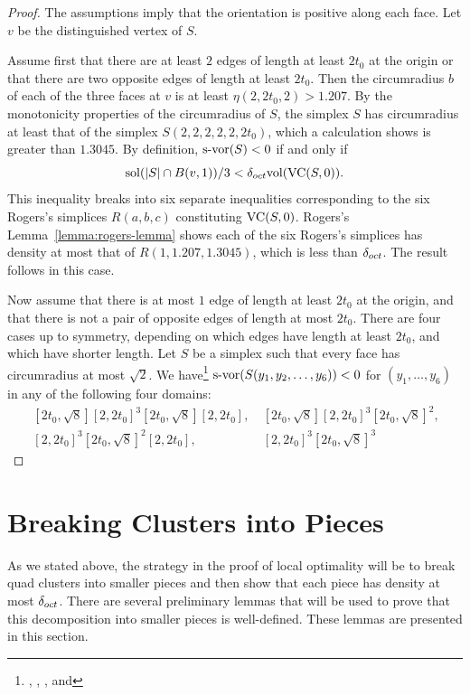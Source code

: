 \begin{proof} The assumptions imply that the orientation is positive
along each face.  Let $v$ be the distinguished vertex of $S$.

Assume first that there are at least $2$ edges of length at least
$2t_0$ at the origin or that there are two opposite edges of length
at least $2t_0$.  Then the circumradius $b$ of each of the three
faces at $v$ is at least $\eta(2,2t_0,2) > 1.207$.  By the
monotonicity properties of the circumradius of $S$, the simplex $S$
has circumradius at least that of the simplex $S(2,2,2,2,2,2t_0)$,
which a calculation shows is greater than $1.3045$.  By definition,
$\operatorname{s-vor}(S)<0$ if and only if
    $$
    \operatorname{sol}(|S|\cap B(v,1))/3 < \delta_{oct} {\operatorname{vol}}({\operatorname{VC}}(S,0)).
    $$
This inequality breaks into six separate inequalities
corresponding to the six Rogers's simplices $R(a,b,c)$
constituting ${\operatorname{VC}}(S,0)$. Rogers's
Lemma~\ref{lemma:rogers-lemma} shows each of the six Rogers's
simplices has density at most that of $R(1,1.207,1.3045)$, which
is less than $\delta_{oct}$.  The result follows in this case.

Now assume that there is at most $1$ edge of length at least
$2t_0$ at the origin, and that there is not a pair of opposite
edges of length at most $2t_0$.  There are four cases up to
symmetry, depending on which edges have length at least $2t_0$,
and which have shorter length.  Let $S$ be a simplex such that
every face has circumradius at most $\sqrt2$.  We
have\footnote{, ,
, and }
$\operatorname{s-vor}(S(y_1,y_2,\ldots,y_6))<0$ for $(y_1,\ldots,y_6)$ in any of
the following four domains:
    $$
    \begin{array}{lll}
        \ [2t_0,\sqrt8][2,2t_0]^3[2t_0,\sqrt8][2,2t_0], &
        \ [2t_0,\sqrt8][2,2t_0]^3[2t_0,\sqrt8]^2,\\
        \ [2,2t_0]^3[2t_0,\sqrt8]^2[2,2t_0],&
        \ [2,2t_0]^3[2t_0,\sqrt8]^3
    \end{array}
    $$
\end{proof}

\bigskip
\section{Breaking Clusters into Pieces}
\label{sec:break_piece}

As we stated above, the strategy in the proof of local optimality
will be to break quad clusters into smaller pieces and then show
that each piece has density at most $\delta_{oct}$.  There are several
preliminary lemmas that will be used to prove that this
decomposition into smaller pieces is well-defined.  These lemmas
are presented in this section.


